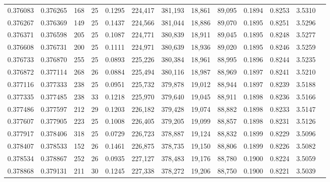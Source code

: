 \begin{tabular}{rrrrrrrrrrrrr}
0.376083 & 0.376265 &   168 &  25 &                                     0.1295 & 224,417 & 381,193 &  18,861 &  89,095 & 0.1894 & 0.8253 & 3.5310 \\
0.376267 & 0.376369 &   149 &  25 &                                     0.1437 & 224,566 & 381,044 &  18,886 &  89,070 & 0.1895 & 0.8251 & 3.5296 \\
0.376371 & 0.376598 &   205 &  25 &                                     0.1087 & 224,771 & 380,839 &  18,911 &  89,045 & 0.1895 & 0.8248 & 3.5277 \\
0.376608 & 0.376731 &   200 &  25 &                                     0.1111 & 224,971 & 380,639 &  18,936 &  89,020 & 0.1895 & 0.8246 & 3.5259 \\
0.376733 & 0.376870 &   255 &  25 &                                     0.0893 & 225,226 & 380,384 &  18,961 &  88,995 & 0.1896 & 0.8244 & 3.5235 \\
0.376872 & 0.377114 &   268 &  26 &                                     0.0884 & 225,494 & 380,116 &  18,987 &  88,969 & 0.1897 & 0.8241 & 3.5210 \\
0.377116 & 0.377333 &   238 &  25 &                                     0.0951 & 225,732 & 379,878 &  19,012 &  88,944 & 0.1897 & 0.8239 & 3.5188 \\
0.377335 & 0.377485 &   238 &  33 &                                     0.1218 & 225,970 & 379,640 &  19,045 &  88,911 & 0.1898 & 0.8236 & 3.5166 \\
0.377486 & 0.377597 &   212 &  29 &                                     0.1203 & 226,182 & 379,428 &  19,074 &  88,882 & 0.1898 & 0.8233 & 3.5147 \\
0.377607 & 0.377905 &   223 &  25 &                                     0.1008 & 226,405 & 379,205 &  19,099 &  88,857 & 0.1898 & 0.8231 & 3.5126 \\
0.377917 & 0.378406 &   318 &  25 &                                     0.0729 & 226,723 & 378,887 &  19,124 &  88,832 & 0.1899 & 0.8229 & 3.5096 \\
0.378407 & 0.378533 &   152 &  26 &                                     0.1461 & 226,875 & 378,735 &  19,150 &  88,806 & 0.1899 & 0.8226 & 3.5082 \\
0.378534 & 0.378867 &   252 &  26 &                                     0.0935 & 227,127 & 378,483 &  19,176 &  88,780 & 0.1900 & 0.8224 & 3.5059 \\
0.378868 & 0.379131 &   211 &  30 &                                     0.1245 & 227,338 & 378,272 &  19,206 &  88,750 & 0.1900 & 0.8221 & 3.5039 \\

\end{tabular}
